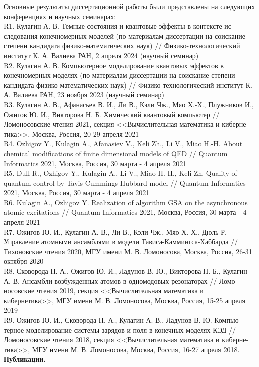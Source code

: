 Основные результаты диссертационной работы были представлены на следующих конференциях и научных семинарах:
\\[12pt]
R1. Кулагин А. В. Темные состояния и квантовые эффекты в контексте ис­следования конечномерных моделей (по материалам диссертации на соискание степени кандидата физико-математических наук) // Физико-технологический институт К. А. Валиева РАН, 2 апреля 2024 (научный семинар)
\\[12pt]
R2. Кулагин А. В. Компьютерное моделирование квантовых эффектов в конечномерных моделях (по материалам диссертации на соискание степени кандидата физико-математических наук) // Физико-технологический институт К. А. Валиева РАН, 23 ноября 2023 (научный семинар)
\\[12pt]
R3. Кулагин А. В., Афанасьев В. И., Ли В., Кэли Чж., Мяо Х.-Х., Плужников И., Ожигов Ю. И., Викторова Н. Б. Химический квантовый компьютер // Ломоносовские чтения 2021, секция <<Вычислительная математика и киберне­тика>>, Москва, Россия, 20-29 апреля 2021
\\[12pt]
R4. Ozhigov Y., Kulagin A., Afanasiev V., Keli Zh., Li V., Miao H.-H. About chemical modifications of finite dimensional models of QED // Quantum Informatics 2021, Москва, Россия, 30 марта - 4 апреля 2021
\\[12pt]
R5. Dull R., Ozhigov Y., Kulagin A., Li V., Miao H.-H., Keli Zh. Quality of quantum control by Tavis-Cummings-Hubbard model // Quantum Informatics 2021, Москва, Россия, 30 марта - 4 апреля 2021
\\[12pt]
R6. Kulagin A., Ozhigov Y. Realization of algorithm GSA on the asynchronous atomic excitations // Quantum Informatics 2021, Москва, Россия, 30 марта - 4 апреля 2021
\\[12pt]
R7. Ожигов Ю. И., Кулагин А. В., Ли В., Кэли Чж., Мяо Х.-Х., Дюль Р. Управление атомными ансамблями в модели Тависа-Каммингса-Хаббарда // Тихоновские чтения 2020, МГУ имени М. В. Ломоносова, Москва, Россия, 26-31 октября 2020
\\[12pt]
R8. Сковорода Н. А., Ожигов Ю. И., Ладунов В. Ю., Викторова Н. Б., Кулагин А. В. Ансамбли возбужденных атомов в одномодовых резонаторах // Ломо­носовские чтения 2019, секция <<Вычислительная математика и кибернетика>>, МГУ имени М. В. Ломоносова, Москва, Россия, 15-25 апреля 2019
\\[12pt]
R9. Ожигов Ю. И., Сковорода Н. А., Кулагин А. В., Ладунов В. Ю. Компью­терное моделирование системы зарядов и поля в конечных моделях КЭД // Ломоносовские чтения 2018, секция <<Вычислительная математика и киберне­тика>>, МГУ имени М. В. Ломоносова, Москва, Россия, 16-27 апреля 2018.
\
\\[18pt]
\indent\textbf{Публикации.}

